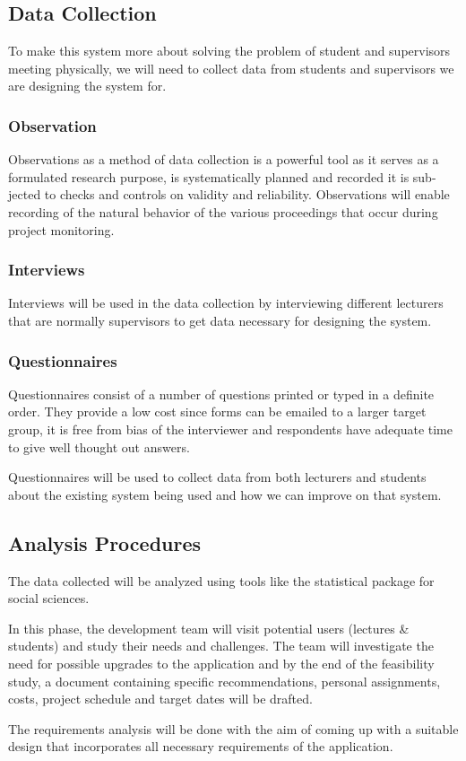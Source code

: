 \documentclass{article}
\begin{document}
\subsection{Data Collection}
To make this system more about solving the problem of student and supervisors
meeting physically, we will need to collect data from students and supervisors
we are designing the system for.
\subsubsection{Observation}
\par Observations as a method of data collection is a powerful tool as it serves as a
formulated research purpose, is systematically planned and recorded it is sub-
jected to checks and controls on validity and reliability. Observations will enable
recording of the natural behavior of the various proceedings that occur during
project monitoring.
\subsubsection{Interviews}
\par Interviews will be used in the data collection by interviewing different lecturers
that are normally supervisors to get data necessary for designing the system.
\subsubsection{Questionnaires}
\par Questionnaires consist of a number of questions printed or typed in a definite order. They provide a low cost since forms can be emailed to a larger target group, it is free from bias of the interviewer and respondents have adequate time to give well thought out answers.
\par Questionnaires will be used to collect data from both lecturers and students about the existing system being used and how we can improve on that system.
\subsection{Analysis Procedures}
\par The data collected will be analyzed using tools like the statistical package for
social sciences.
\par In this phase, the development team will visit potential users (lectures \&
students) and study their needs and challenges. The team will investigate the
need for possible upgrades to the application and by the end of the feasibility
study, a document containing specific  recommendations, personal assignments, costs, project schedule and target dates will be drafted.
\par The requirements analysis will be done with the aim of coming up with a suitable design that incorporates all necessary requirements of the application.
\newpage
\end{document}
